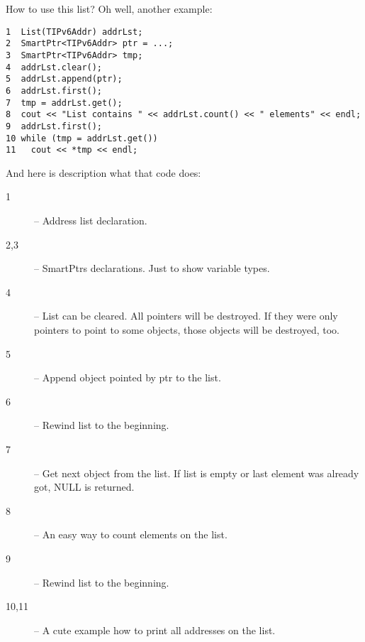 How to use this list? Oh well, another example:
\begin{verbatim}
1  List(TIPv6Addr) addrLst;
2  SmartPtr<TIPv6Addr> ptr = ...;
3  SmartPtr<TIPv6Addr> tmp;
4  addrLst.clear();
5  addrLst.append(ptr);
6  addrLst.first();
7  tmp = addrLst.get();
8  cout << "List contains " << addrLst.count() << " elements" << endl;
9  addrLst.first();
10 while (tmp = addrLst.get()) 
11   cout << *tmp << endl;
\end{verbatim}

And here is description what that code does:

\begin{description}
\item[1] -- Address list declaration.
\item[2,3] -- SmartPtrs declarations. Just to show variable types.
\item[4] -- List can be cleared. All pointers will be destroyed. If
  they were only pointers to point to some objects, those objects will
  be destroyed, too.
\item[5] -- Append object pointed by ptr to the list.
\item[6] -- Rewind list to the beginning.
\item[7] -- Get next object from the list. If list is empty or last
  element was already got, NULL is returned.
\item[8] -- An easy way to count elements on the list.
\item[9] -- Rewind list to the beginning.
\item[10,11] -- A cute example how to print all addresses on the list.
\end{description}

